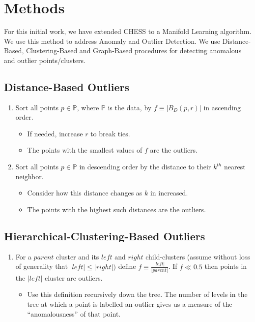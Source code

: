 \section{Methods}
\label{sec:methods}

For this initial work, we have extended CHESS to a Manifold Learning algorithm.
We use this method to address Anomaly and Outlier Detection.
We use Distance-Based, Clustering-Based and Graph-Based procedures for detecting anomalous and outlier points/clusters.


\subsection{Distance-Based Outliers}

\begin{enumerate}
    \item Sort all points $p \in \mathbb{P}$, where $\mathbb{P}$ is the data, by $f \equiv |B_D(p, r)|$ in ascending order.
    \begin{itemize}
        \item If needed, increase $r$ to break ties.
        \item The points with the smallest values of $f$ are the outliers.
    \end{itemize}
    \item Sort all points $p \in \mathbb{P}$ in descending order by the distance to their $k^{th}$ nearest neighbor.
    \begin{itemize}
        \item Consider how this distance changes as $k$ in increased.
        \item The points with the highest such distances are the outliers.
    \end{itemize}
\end{enumerate}

\subsection{Hierarchical-Clustering-Based Outliers}

\begin{enumerate}
    \item For a $parent$ cluster and its $left$ and $right$ child-clusters (assume without loss of generality that $|left| \leq |right|)$ define $f \equiv \frac{|left|}{|parent|}$. If $f \ll 0.5$ then points in the $|left|$ cluster are outliers.
    \begin{itemize}
        \item Use this definition recursively down the tree. The number of levels in the tree at which a point is labelled an outlier gives us a measure of the ``anomalousness'' of that point.
    \end{itemize}
\end{enumerate}


